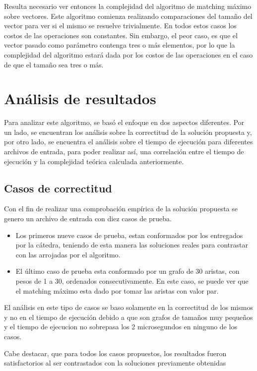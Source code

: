 \documentclass[a4paper, 12pt]{article}
\begin{document}
Resulta necesario ver entonces la complejidad del algoritmo de matching m\'aximo sobre vectores.
Este algoritmo comienza realizando comparaciones del tama\~{n}o del vector para ver si el mismo se resuelve trivialmente. En todos estos casos los costos de las operaciones son constantes. Sin embargo, el peor caso, es que el vector pasado como par\'ametro contenga tres o m\'as elementos, por lo que la complejidad del algoritmo estar\'a dada por los costos de las operaciones en el caso de que el tama\~{n}o sea tres o m\'as.
\section*{An\'alisis de resultados}

Para analizar este algoritmo, se bas\'o el enfoque en dos aspectos diferentes. Por un lado, se encuentran los an\'alisis sobre la correctitud de la soluci\'on propuesta y, por otro lado, se encuentra el an\'alisis sobre el tiempo de ejecuci\'on para diferentes archivos de entrada, para poder realizar as\'i, una correlaci\'on entre el tiempo de ejecuci\'on y la complejidad te\'orica calculada anteriormente.

\subsection*{Casos de correctitud}
Con el fin de realizar una comprobaci\'on emp\'irica de la soluci\'on propuesta se genero un archivo de entrada con diez casos de prueba.
\begin{itemize}
\item Los primeros nueve casos de prueba, estan conformados por los entregados por la c\'atedra, teniendo de esta manera las soluciones reales para contrastar con las arrojadas por el algoritmo.
\item El \'ultimo caso de prueba esta conformado por un grafo de 30 aristas, con pesos de 1 a 30, ordenados consecutivamente. En este caso, se puede ver que el matching m\'aximo esta dado por tomar las aristas con valor par.
\end{itemize}

El an\'alisis en este tipo de casos se baso solamente en la correctitud de los mismos y no en el tiempo de ejecuci\'on debido a que son grafos de tama\~{n}os muy peque\~{n}os y el tiempo de ejecucion no sobrepasa los 2 microsegundos en ninguno de los casos.

Cabe destacar, que para todos los casos propuestos, los resultados fueron satisfactorios al ser contrastados con la soluciones previamente obtenidas
\end{document}
